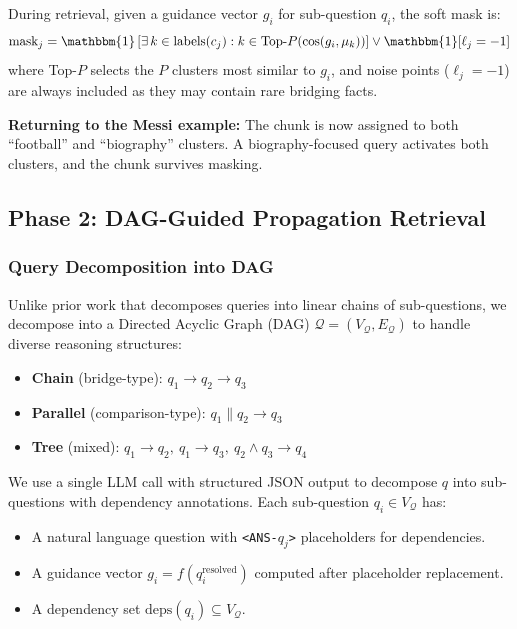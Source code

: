 \documentclass[11pt,a4paper]{article}
\begin{document}
During retrieval, given a guidance vector $g_i$ for sub-question $q_i$, the soft mask is:
\begin{equation}
    \text{mask}_j = \mathbbm{1}\left[\exists\, k \in \text{labels}(c_j) : k \in \text{Top-}P(\cos(g_i, \mu_k))\right] \lor \mathbbm{1}[\ell_j = -1]
\end{equation}
where Top-$P$ selects the $P$ clusters most similar to $g_i$, and noise points ($\ell_j = -1$) are always included as they may contain rare bridging facts.

\textbf{Returning to the Messi example:} The chunk is now assigned to both ``football'' and ``biography'' clusters. A biography-focused query activates both clusters, and the chunk survives masking.


\subsection{Phase 2: DAG-Guided Propagation Retrieval}

\subsubsection{Query Decomposition into DAG}

Unlike prior work that decomposes queries into linear chains of sub-questions, we decompose into a Directed Acyclic Graph (DAG) $\mathcal{Q} = (V_\mathcal{Q}, E_\mathcal{Q})$ to handle diverse reasoning structures:

\begin{itemize}[leftmargin=*]
    \item \textbf{Chain} (bridge-type): $q_1 \to q_2 \to q_3$
    \item \textbf{Parallel} (comparison-type): $q_1 \| q_2 \to q_3$
    \item \textbf{Tree} (mixed): $q_1 \to q_2,\ q_1 \to q_3,\ q_2 \wedge q_3 \to q_4$
\end{itemize}

We use a single LLM call with structured JSON output to decompose $q$ into sub-questions with dependency annotations. Each sub-question $q_i \in V_\mathcal{Q}$ has:
\begin{itemize}[leftmargin=*]
    \item A natural language question with \texttt{<ANS-$q_j$>} placeholders for dependencies.
    \item A guidance vector $g_i = f(q_i^{\text{resolved}})$ computed after placeholder replacement.
    \item A dependency set $\text{deps}(q_i) \subseteq V_\mathcal{Q}$.
\end{itemize}
\end{document}
